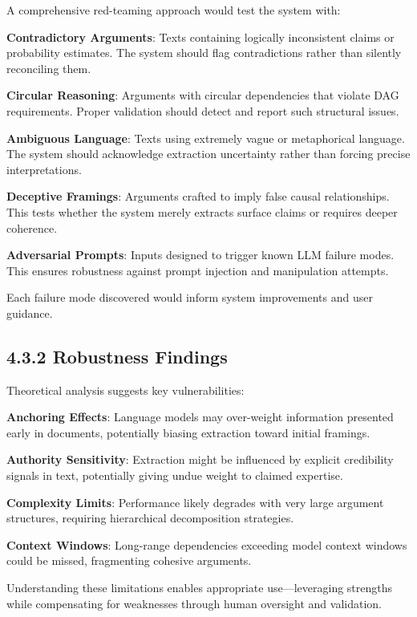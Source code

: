 \documentclass[
  11pt,
  letterpaper,
]{book}
\begin{document}
A comprehensive red-teaming approach would test the system with:

\textbf{Contradictory Arguments}: Texts containing logically
inconsistent claims or probability estimates. The system should flag
contradictions rather than silently reconciling them.

\textbf{Circular Reasoning}: Arguments with circular dependencies that
violate DAG requirements. Proper validation should detect and report
such structural issues.

\textbf{Ambiguous Language}: Texts using extremely vague or metaphorical
language. The system should acknowledge extraction uncertainty rather
than forcing precise interpretations.

\textbf{Deceptive Framings}: Arguments crafted to imply false causal
relationships. This tests whether the system merely extracts surface
claims or requires deeper coherence.

\textbf{Adversarial Prompts}: Inputs designed to trigger known LLM
failure modes. This ensures robustness against prompt injection and
manipulation attempts.

Each failure mode discovered would inform system improvements and user
guidance.

\subsection{4.3.2 Robustness Findings}\label{sec-robustness-findings}

Theoretical analysis suggests key vulnerabilities:

\textbf{Anchoring Effects}: Language models may over-weight information
presented early in documents, potentially biasing extraction toward
initial framings.

\textbf{Authority Sensitivity}: Extraction might be influenced by
explicit credibility signals in text, potentially giving undue weight to
claimed expertise.

\textbf{Complexity Limits}: Performance likely degrades with very large
argument structures, requiring hierarchical decomposition strategies.

\textbf{Context Windows}: Long-range dependencies exceeding model
context windows could be missed, fragmenting cohesive arguments.

Understanding these limitations enables appropriate use---leveraging
strengths while compensating for weaknesses through human oversight and
validation.
\end{document}
